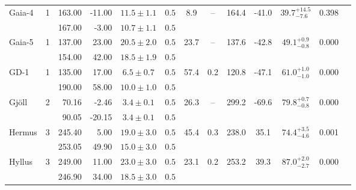 \begin{tabular}{lcrrccccccccr}
	\multirow{2}{*}{Gaia-4} & \multirow{2}{*}{1} & 163.00 & -11.00 & $11.5 \pm 1.1$ & $0.5$ & \multirow{2}{*}{8.9} & \multirow{2}{*}{--} & \multirow{2}{*}{164.4} & \multirow{2}{*}{-41.0} & \multirow{2}{*}{$39.7^{+14.5}_{-7.6}$} & \multirow{2}{*}{0.398} & \multirow{2}{*}{\citet{Malhan:2018}} \\
	 &  & 167.00 & -3.00 & $10.7 \pm 1.1$ & $0.5$ &  &  &  &  &  &  &  \\
	\multirow{2}{*}{Gaia-5} & \multirow{2}{*}{1} & 137.00 & 23.00 & $20.5 \pm 2.0$ & $0.5$ & \multirow{2}{*}{23.7} & \multirow{2}{*}{--} & \multirow{2}{*}{137.6} & \multirow{2}{*}{-42.8} & \multirow{2}{*}{$49.1^{+0.9}_{-0.8}$} & \multirow{2}{*}{0.000} & \multirow{2}{*}{\citet{Malhan:2018}} \\
	 &  & 154.00 & 42.00 & $18.5 \pm 1.9$ & $0.5$ &  &  &  &  &  &  &  \\
	\multirow{2}{*}{GD-1} & \multirow{2}{*}{1} & 135.00 & 17.00 & $6.5 \pm 0.7$ & $0.5$ & \multirow{2}{*}{57.4} & \multirow{2}{*}{0.2} & \multirow{2}{*}{120.8} & \multirow{2}{*}{-47.1} & \multirow{2}{*}{$61.0^{+1.0}_{-1.0}$} & \multirow{2}{*}{0.000} & \multirow{2}{*}{\citet{Malhan:2018}} \\
	 &  & 190.00 & 58.00 & $10.0 \pm 1.0$ & $0.5$ &  &  &  &  &  &  &  \\
	\multirow{2}{*}{Gj\"{o}ll} & \multirow{2}{*}{2} & 70.16 & -2.46 & $3.4 \pm 0.1$ & $0.5$ & \multirow{2}{*}{26.3} & \multirow{2}{*}{--} & \multirow{2}{*}{299.2} & \multirow{2}{*}{-69.6} & \multirow{2}{*}{$79.8^{+0.7}_{-0.8}$} & \multirow{2}{*}{0.000} & \multirow{2}{*}{\citet{Ibata:2019}} \\
	 &  & 90.05 & -20.15 & $3.4 \pm 0.1$ & $0.5$ &  &  &  &  &  &  &  \\
	\multirow{2}{*}{Hermus} & \multirow{2}{*}{3} & 245.40 & 5.00 & $19.0 \pm 3.0$ & $0.5$ & \multirow{2}{*}{45.4} & \multirow{2}{*}{0.3} & \multirow{2}{*}{238.0} & \multirow{2}{*}{35.1} & \multirow{2}{*}{$74.4^{+3.5}_{-4.6}$} & \multirow{2}{*}{0.001} & \multirow{2}{*}{\citet{Grillmair:2014}} \\
	 &  & 253.05 & 49.90 & $15.0 \pm 3.0$ & $0.5$ &  &  &  &  &  &  &  \\
	\multirow{2}{*}{Hyllus} & \multirow{2}{*}{3} & 249.00 & 11.00 & $23.0 \pm 3.0$ & $0.5$ & \multirow{2}{*}{23.1} & \multirow{2}{*}{0.2} & \multirow{2}{*}{253.2} & \multirow{2}{*}{39.3} & \multirow{2}{*}{$87.0^{+2.0}_{-2.7}$} & \multirow{2}{*}{0.000} & \multirow{2}{*}{\citet{Grillmair:2014}} \\
	 &  & 246.90 & 34.00 & $18.5 \pm 3.0$ & $0.5$ &  &  &  &  &  &  &  \\

\end{tabular}
